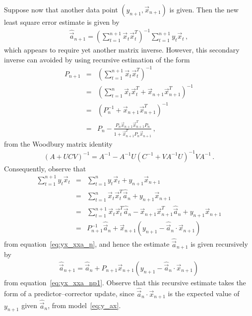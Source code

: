 \documentclass[a4paper]{article}
\begin{document}
Suppose now that another data point $(y_{n+1},\vec{x}_{n+1})$ is given. Then the new least square error estimate
is given by
\begin{eqnarray}
   \hat{\vec{a}}_{n+1} = \left(\sum_{t=1}^{n+1}\vec{x}_t\vec{x}_t^{T}\right)^{-1}\sum_{t=1}^{n+1} y_t\vec{x}_t\,,
\label{eq:yx_xxa_np1}
\end{eqnarray}
which appears to require yet another matrix inverse. However, this secondary inverse can avoided by using recursive estimation
of the form
\begin{eqnarray}
   P_{n+1} & = & \left(\sum_{t=1}^{n+1}\vec{x}_t\vec{x}_t^{T}\right)^{-1}
\nonumber\\
  & = & \left(\sum_{t=1}^{n}\vec{x}_t\vec{x}_t^{T}+\vec{x}_{n+1}\vec{x}_{n+1}^{T}\right)^{-1}
\nonumber\\
  & = & \left(P_n^{-1}+\vec{x}_{n+1}\vec{x}_{n+1}^{T}\right)^{-1}
\nonumber\\
  & = & P_n-\frac{P_n\vec{x}_{n+1}\vec{x}_{n+1}^{T}P_n}{1+\vec{x}_{n+1}^{T}P_n\vec{x}_{n+1}}\,,
\end{eqnarray}
from the Woodbury matrix identity 
\begin{eqnarray}
    \left(A+UCV \right)^{-1} = A^{-1} - A^{-1}U \left(C^{-1}+VA^{-1}U \right)^{-1} VA^{-1}\,.
\end{eqnarray}
Consequently, observe that
\begin{eqnarray}
   \sum_{t=1}^{n+1} y_t\vec{x}_t & = & \sum_{t=1}^{n} y_t\vec{x}_t+y_{n+1}\vec{x}_{n+1}
\nonumber\\
& = & \sum_{t=1}^n\vec{x}_t\vec{x}_t^{T}\hat{\vec{a}}_n+y_{n+1}\vec{x}_{n+1}
\nonumber\\
& = & \sum_{t=1}^{n+1}\vec{x}_t\vec{x}_t^{T}\hat{\vec{a}}_n-\vec{x}_{n+1}\vec{x}_{n+1}^{T}\hat{\vec{a}}_n
         +y_{n+1}\vec{x}_{n+1}
\nonumber\\
& = & P_{n+1}^{-1}\hat{\vec{a}}_n+\vec{x}_{n+1}(y_{n+1}-\hat{\vec{a}}_n\cdot\vec{x}_{n+1})
\end{eqnarray}
from equation~\eqref{eq:yx_xxa_n}, and hence the estimate $\hat{\vec{a}}_{n+1}$ is given recursively by
\begin{eqnarray}
   \hat{\vec{a}}_{n+1} = \hat{\vec{a}}_{n} + P_{n+1} \vec{x}_{n+1}(y_{n+1}-\hat{\vec{a}}_n\cdot\vec{x}_{n+1})
\end{eqnarray}
from equation~\eqref{eq:yx_xxa_np1}. Observe that this recursive estimate takes the form of a predictor--corrector
update, since $\hat{\vec{a}}_n\cdot\vec{x}_{n+1}$ is the expected value of
$y_{n+1}$ given $\hat{\vec{a}}_n$, from model~\eqref{eq:y_ax}.
\end{document}
